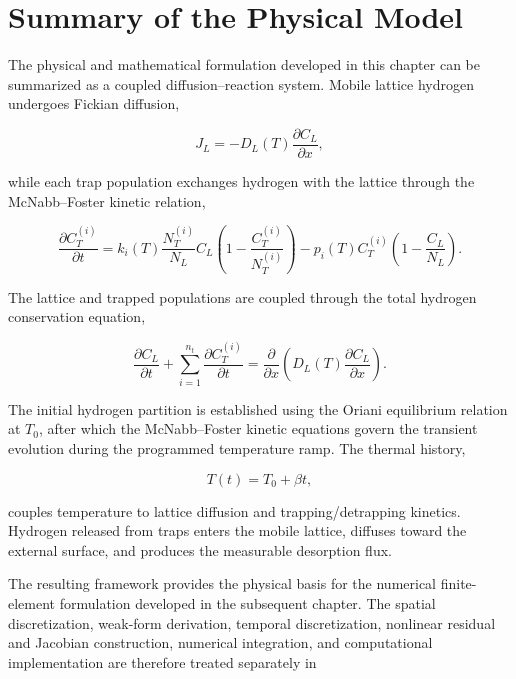 \section{Summary of the Physical Model}
\label{sec:physical_model_summary}

The physical and mathematical formulation developed in this chapter
can be summarized as a coupled diffusion--reaction system. Mobile
lattice hydrogen undergoes Fickian diffusion,

\begin{equation}
J_L=-D_L(T)\frac{\partial C_L}{\partial x},
\end{equation}

while each trap population exchanges hydrogen with the lattice through
the McNabb--Foster kinetic relation,

\begin{equation}
\frac{\partial C_T^{(i)}}{\partial t}
=
k_i(T)
\frac{N_T^{(i)}}{N_L}
C_L
\left(
1-\frac{C_T^{(i)}}{N_T^{(i)}}
\right)
-
p_i(T)C_T^{(i)}
\left(
1-\frac{C_L}{N_L}
\right).
\end{equation}

The lattice and trapped populations are coupled through the total
hydrogen conservation equation,

\begin{equation}
\frac{\partial C_L}{\partial t}
+
\sum_{i=1}^{n_t}
\frac{\partial C_T^{(i)}}{\partial t}
=
\frac{\partial}{\partial x}
\left(
D_L(T)
\frac{\partial C_L}{\partial x}
\right).
\end{equation}

The initial hydrogen partition is established using the Oriani
equilibrium relation at $T_0$, after which the McNabb--Foster kinetic
equations govern the transient evolution during the programmed
temperature ramp. The thermal history,

\begin{equation}
T(t)=T_0+\beta t,
\end{equation}

couples temperature to lattice diffusion and trapping/detrapping
kinetics. Hydrogen released from traps enters the mobile lattice,
diffuses toward the external surface, and produces the measurable
desorption flux.

The resulting framework provides the physical basis for the numerical
finite-element formulation developed in the subsequent chapter. The
spatial discretization, weak-form derivation, temporal discretization,
nonlinear residual and Jacobian construction, numerical integration,
and computational implementation are therefore treated separately in